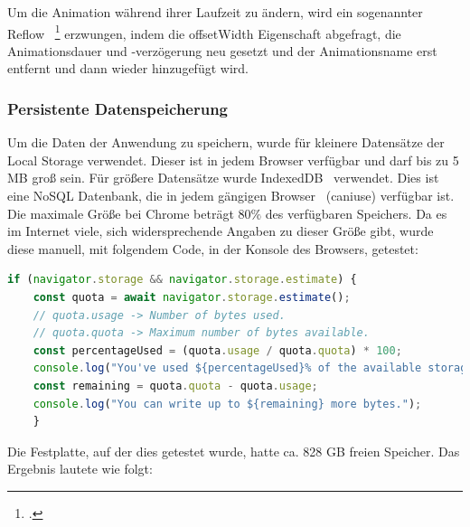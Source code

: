 \newline
\newline
Um die Animation während ihrer Laufzeit zu ändern, wird ein sogenannter Reflow ~\footcite{JavaScriptAnimationsReflow} erzwungen, indem die offsetWidth Eigenschaft abgefragt, die Animationsdauer und -verzögerung neu gesetzt und der Animationsname erst entfernt und dann wieder hinzugefügt wird.
\newline
\newline
\subsubsection{Persistente Datenspeicherung}
Um die Daten der Anwendung zu speichern, wurde für kleinere Datensätze der Local Storage verwendet.
Dieser ist in jedem Browser verfügbar und darf bis zu 5 MB groß sein.
\newline
\newline
Für größere Datensätze wurde IndexedDB~\cite{IndexedDB} verwendet.
Dies ist eine NoSQL Datenbank, die in jedem gängigen Browser~\cite{caniuse-indexedDB} (\gls{caniuse}) verfügbar ist.
Die maximale Größe bei Chrome beträgt 80\(\%\) des verfügbaren Speichers.
Da es im Internet viele, sich widersprechende Angaben zu dieser Größe gibt, wurde diese manuell, mit folgendem Code, in der Konsole des Browsers, getestet:
\newline
\newline
\begin{lstlisting}[language=javascript,label={lst:JavaScript IndexedDB Speichergröße}]
    if (navigator.storage && navigator.storage.estimate) {
    const quota = await navigator.storage.estimate();
    // quota.usage -> Number of bytes used.
    // quota.quota -> Maximum number of bytes available.
    const percentageUsed = (quota.usage / quota.quota) * 100;
    console.log("You've used ${percentageUsed}% of the available storage.");
    const remaining = quota.quota - quota.usage;
    console.log("You can write up to ${remaining} more bytes.");
    }
\end{lstlisting}
\newline
\newline
Die Festplatte, auf der dies getestet wurde, hatte ca. 828 GB freien Speicher.
Das Ergebnis lautete wie folgt:
\newline
\newline
